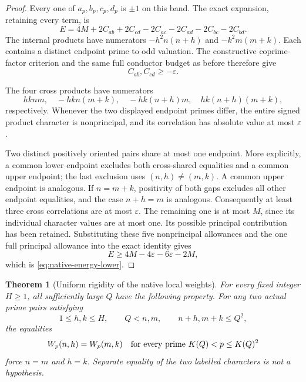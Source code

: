 \documentclass[11pt]{article}
\newtheorem{theorem}{Theorem}[section]
\begin{document}
\begin{proof}
Every one of \(a_p,b_p,c_p,d_p\) is \(\pm1\) on this band.
The exact expansion, retaining every term, is
\begin{equation}\label{eq:native-full-energy}
 E=4M+2C_{ab}+2C_{cd}
             -2C_{ac}-2C_{ad}-2C_{bc}-2C_{bd}.
\end{equation}
The internal products have numerators
\(-h^2n(n+h)\) and \(-k^2m(m+k)\).
Each contains a distinct endpoint prime to odd valuation.
The constructive coprime-factor criterion and the same full conductor
budget as before therefore give
\[
                   C_{ab},C_{cd}\ge-\varepsilon.
\]

The four cross products have numerators
\[
 hknm,\quad -hkn(m+k),\quad
             -hk(n+h)m,\quad hk(n+h)(m+k),
\]
respectively.  Whenever the two displayed endpoint primes differ,
the entire signed product character is nonprincipal, and its correlation
has absolute value at most \(\varepsilon\).

Two distinct positively oriented pairs share at most one endpoint.
More explicitly, a common lower endpoint excludes both cross-shared
equalities and a common upper endpoint; the last exclusion uses
\((n,h)\ne(m,k)\).  A common upper endpoint is analogous.
If \(n=m+k\), positivity of both gaps excludes all other endpoint
equalities, and the case \(n+h=m\) is analogous.
Consequently at least three cross correlations are at most
\(\varepsilon\).  The remaining one is at most \(M\), since its
individual character values are at most one.  Its possible principal
contribution has been retained.
Substituting these five nonprincipal allowances and the one full
principal allowance into the exact identity gives
\[
                  E\ge4M-4\varepsilon-6\varepsilon-2M,
\]
which is \eqref{eq:native-energy-lower}.
\end{proof}

\begin{theorem}[Uniform rigidity of the native local weights]
\label{thm:native-integer-return}
For every fixed integer \(H\ge1\), all sufficiently large \(Q\) have
the following property.  For any two actual prime pairs satisfying
\[
 1\le h,k\le H,\qquad Q<n,m,\qquad n+h,m+k\le Q^2,
\]
the equalities
\[
 W_p(n,h)=W_p(m,k)
 \quad\hbox{for every prime }K(Q)<p\le K(Q)^2
\]
force \(n=m\) and \(h=k\).
Separate equality of the two labelled characters is not a hypothesis.
\end{theorem}
\end{document}
